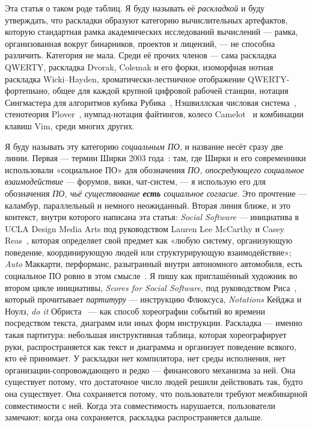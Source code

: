 \documentclass[10pt,letterpaper,twocolumn]{article}
\begin{document}
Эта статья о таком роде таблиц. Я буду называть её \emph{раскладкой} и буду утверждать, что раскладки образуют категорию вычислительных артефактов, которую стандартная рамка академических исследований вычислений --- рамка, организованная вокруг бинарников, проектов и лицензий, --- не способна различить. Категория не мала. Среди её прочих членов --- сама раскладка QWERTY, раскладка Dvorak, Colemak и его форки, изоморфная нотная раскладка Wicki--Hayden, хроматически-лестничное отображение QWERTY-фортепиано, общее для каждой крупной цифровой рабочей станции, нотация Сингмастера для алгоритмов кубика Рубика~\citep{singmaster1981notes}, Нэшвиллская числовая система~\citep{matthews1984nashville}, стенотеория Plover~\citep{knight2010plover}, нумпад-нотация файтингов, колесо Camelot~\citep{davis1991camelot} и комбинации клавиш Vim, среди многих других.

Я буду называть эту категорию \emph{социальным ПО}, и название несёт сразу две линии. Первая --- термин Ширки 2003 года~\citep{shirky2003etech,allen2004socialsoftware}: там, где Ширки и его современники использовали «социальное ПО» для обозначения \emph{ПО, опосредующего социальное взаимодействие} --- форумов, вики, чат-систем, --- я использую его для обозначения \emph{ПО, чьё существование \textbf{есть} социальное согласие}. Это прочтение --- каламбур, параллельный и немного неожиданный. Вторая линия ближе, и это контекст, внутри которого написана эта статья: \emph{Social Software} --- инициатива в UCLA Design\,\textbar\,Media Arts под руководством Lauren Lee McCarthy и Casey Reas~\citep{sosoft_info}, которая определяет свой предмет как «любую систему, организующую поведение, координирующую людей или структурирующую взаимодействие»; \emph{Auto} Маккарти, перформанс, разыгранный внутри автономного автомобиля, есть социальное ПО ровно в этом смысле~\citep{mccarthy2026auto}. Я пишу как приглашённый художник во втором цикле инициативы, \emph{Scores for Social Software}, под руководством Риса~\citep{reas2026scores}, который прочитывает \emph{партитуру} --- инструкцию Флюксуса, \emph{Notations} Кейджа и Ноулз, \emph{do it} Обриста~\citep{cage1969notations,obrist1997doit} --- как способ хореографии событий во времени посредством текста, диаграмм или иных форм инструкции. Раскладка --- именно такая партитура: небольшая инструктивная таблица, которая хореографирует руки, распространяется как текст и диаграмма и организует поведение всякого, кто её принимает. У раскладки нет компилятора, нет среды исполнения, нет организации-сопровождающего и редко --- финансового механизма за ней. Она существует потому, что достаточное число людей решили действовать так, будто она существует. Она сохраняется потому, что пользователи требуют межбинарной совместимости с ней. Когда эта совместимость нарушается, пользователи замечают; когда она сохраняется, раскладка распространяется дальше.
\end{document}
